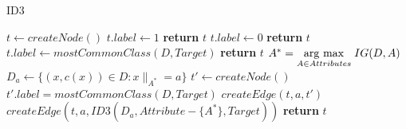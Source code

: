 \begin{algorithm}
	\caption{ID3}\label{alg:id3}
	\begin{algorithmic}[1]
			\State $t\gets createNode()$
				\State $t.label\gets 1$
				\State \textbf{return} $t$
				\State $t.label\gets 0$
				\State \textbf{return} $t$
				\State $t.label\gets mostCommonClass(D, Target)$
				\State \textbf{return} $t$
			\Else
				\State $A^* = \underset{A\in Attributes}{\operatorname{arg}\,\operatorname{max}}\;IG(D, A)$
					\State $D_a\gets\{(x,c(x))\in D : x\|_{A^*}=a\}$
						\State $t'\gets createNode()$
						\State $t'.label = mostCommonClass(D, Target)$
						\State $createEdge(t, a, t')$
					\Else
						\State $createEdge(t, a, ID3(D_a, Attribute -\{A^*\}, Target))$
					\EndIf
				\EndFor
			\EndIf
			\State \textbf{return} $t$
		\EndProcedure
	\end{algorithmic}
\end{algorithm}